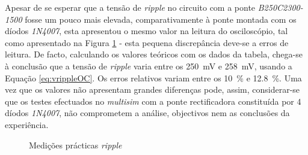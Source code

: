 Apesar de se esperar que a tensão de \textit{ripple} no circuito com a ponte \textit{B250C2300-1500} fosse um pouco mais elevada, comparativamente à ponte montada com os díodos \textit{1N4007}, esta apresentou o mesmo valor na leitura do osciloscópio, tal como apresentado na Figura \ref{fig:testesrippleOC} - esta pequena discrepância deve-se a erros de leitura. De facto, calculando os valores teóricos com os dados da tabela, chega-se à conclusão que a tensão de \textit{ripple} varia entre os \SI{250}{\milli\volt} e \SI{258}{\milli\volt}, usando a Equação \ref{eq:vrippleOC}. Os erros relativos variam entre os \SI{10}{\percent} e \SI{12.8}{\percent}. Uma vez que os valores não apresentam grandes diferenças pode, assim, considerar-se que os testes efectuados no \textit{multisim} com a ponte rectificadora constituída por 4 díodos \textit{1N4007}, não comprometem a análise, objectivos nem as conclusões da experiência.

\begin{figure}[hbtp]
	\centering%
		\centering
		\qquad
		\caption{Medições prácticas  \textit{ripple}}%
		\label{fig:testesrippleOC}%
	\end{figure}

